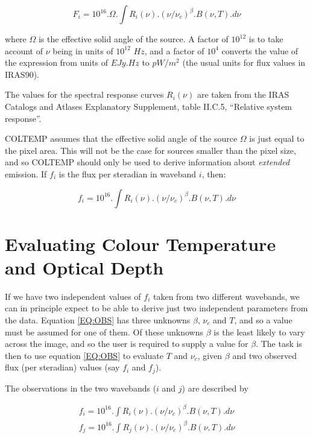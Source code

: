 \begin{equation}
F_{i} = 10^{16}.\Omega.\int R_{i}(\nu).(\nu/\nu_{c})^{\beta}.B( \nu, T ).d\nu
\end{equation}

where $\Omega$ is the effective solid angle of the source. A factor of $10^{12}$
is to take account of $\nu$ being in units of $10^{12}$ $Hz$, and a factor of
$10^{4}$ converts the value of the expression from units of $EJy.Hz$ to
$pW/m^{2}$ (the usual units for flux values in {\small IRAS90}).

The values for the spectral response curves $R_{i}(\nu)$ are taken from the
{\small IRAS} Catalogs and Atlases Explanatory Supplement, table II.C.5,
``Relative system response''.

{\small COLTEMP} assumes that the effective solid angle of the source $\Omega$
is just equal to the pixel area. This will not be the case for sources smaller
than the pixel size, and so {\small COLTEMP} should only be used to derive
information about {\em extended} emission. If $f_{i}$ is the flux per steradian
in waveband $i$, then:

\begin{equation}
\label{EQ:OBS}
f_{i} = 10^{16}.\int R_{i}(\nu).(\nu/\nu_{c})^{\beta}.B( \nu, T ).d\nu
\end{equation}

\section{Evaluating Colour Temperature and Optical Depth}
If we have two independent values of $f_{i}$ taken from two different wavebands,
we can in principle expect to be able to derive just two independent parameters
from the data. Equation \ref{EQ:OBS} has three unknowns $\beta$, $\nu_{c}$ and
$T$, and so a value must be assumed for one of them. Of these unknowns $\beta$
is the least likely to vary across the image, and so the user is required to
supply a value for $\beta$. The task is then to use equation \ref{EQ:OBS} to
evaluate $T$ and $\nu_{c}$, given $\beta$ and two observed flux (per steradian)
values (say $f_{i}$ and $f_{j}$).

The observations in the two wavebands ($i$ and $j$) are described by

\begin{eqnarray*}
f_{i} = 10^{16}.\int R_{i}(\nu).(\nu/\nu_{c})^{\beta}.B( \nu, T ).d\nu\\
f_{j} = 10^{16}.\int R_{j}(\nu).(\nu/\nu_{c})^{\beta}.B( \nu, T ).d\nu
\end{eqnarray*}

